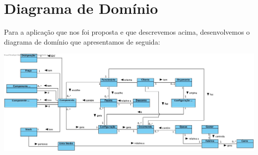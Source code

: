 \section{Diagrama de Domínio}
Para a aplicação que nos foi proposta e que descrevemos acima, desenvolvemos o diagrama de domínio que apresentamos de seguida:
\begin{center}
 \includegraphics[width = 6.5in]{VPP/Dominio.jpg}
\end{center}

\newpage